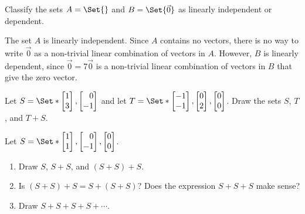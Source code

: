 \begin{exercises}
\begin{problist}
\begin{solution}
		\end{solution}

		\prob Classify the sets $A=\Set{}$ and $B=$ as linearly independent or dependent.
		\begin{solution}
			The set $A$ is linearly independent. Since $A$ contains no vectors, there is no way to
			write $$ as a non-trivial linear combination of vectors in $A$. However, $B$ is linearly
			dependent, since $\vec 0=7$ is a non-trivial linear combination of vectors in $B$ that give
			the zero vector.
		\end{solution}
		
		\prob Let $S=$ and let $T=$. Draw
		the sets $S$, $T$, and $T+S$.
		
		\prob Let $S=$. 
		\begin{enumerate}
			\item 
			Draw $S$, $S+S$, and $(S+S)+S$.
			\item Is $(S+S)+S=S+(S+S)$? Does the expression $S+S+S$ make sense?
			\item Draw $S+S+S+S+\cdots$.
		\end{enumerate}
		

\end{problist}
\end{exercises}
